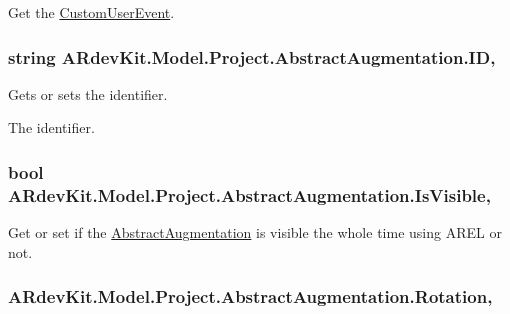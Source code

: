Get the \hyperlink{class_a_rdev_kit_1_1_model_1_1_project_1_1_custom_user_event}{Custom\-User\-Event}. 

\hypertarget{class_a_rdev_kit_1_1_model_1_1_project_1_1_abstract_augmentation_a3590cc30e6169c0946c70b52223eb2bf}{
\subsubsection[{I\-D}]{\setlength{\rightskip}{0pt plus 5cm}string A\-Rdev\-Kit.\-Model.\-Project.\-Abstract\-Augmentation.\-I\-D\hspace{0.3cm}{\ttfamily [get]}, {\ttfamily [set]}}}\label{class_a_rdev_kit_1_1_model_1_1_project_1_1_abstract_augmentation_a3590cc30e6169c0946c70b52223eb2bf}


Gets or sets the identifier. 

The identifier. \hypertarget{class_a_rdev_kit_1_1_model_1_1_project_1_1_abstract_augmentation_ab19dda553062c0cae9e4a7a66e9cb64f}{
\subsubsection[{Is\-Visible}]{\setlength{\rightskip}{0pt plus 5cm}bool A\-Rdev\-Kit.\-Model.\-Project.\-Abstract\-Augmentation.\-Is\-Visible\hspace{0.3cm}{\ttfamily [get]}, {\ttfamily [set]}}}\label{class_a_rdev_kit_1_1_model_1_1_project_1_1_abstract_augmentation_ab19dda553062c0cae9e4a7a66e9cb64f}


Get or set if the \hyperlink{class_a_rdev_kit_1_1_model_1_1_project_1_1_abstract_augmentation}{Abstract\-Augmentation} is visible the whole time using A\-R\-E\-L or not. 

\hypertarget{class_a_rdev_kit_1_1_model_1_1_project_1_1_abstract_augmentation_ac94095d5fa4f5d4339f66b259ff55e74}{
\subsubsection[{Rotation}]{ A\-Rdev\-Kit.\-Model.\-Project.\-Abstract\-Augmentation.\-Rotation\hspace{0.3cm}{\ttfamily [get]}, {\ttfamily [set]}}}\label{class_a_rdev_kit_1_1_model_1_1_project_1_1_abstract_augmentation_ac94095d5fa4f5d4339f66b259ff55e74}


